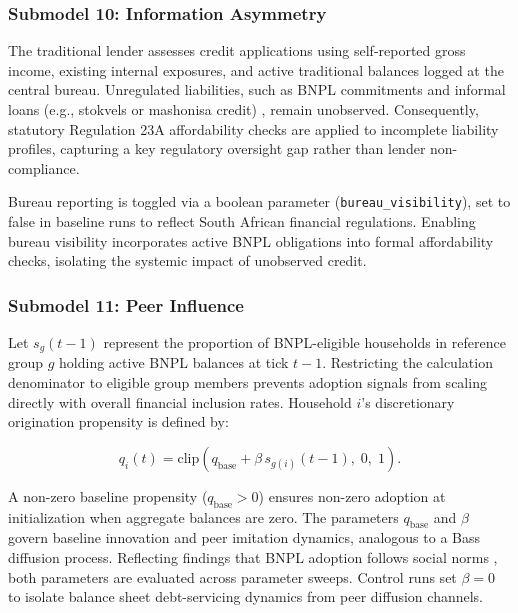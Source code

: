 \subsubsection*{Submodel 10: Information Asymmetry}
\label{sec:asymmetry}

The traditional lender assesses credit applications using self-reported gross income, existing internal exposures, and active traditional balances logged at the central bureau.
Unregulated liabilities, such as \ac{BNPL} commitments \cite{nortonrose_bnpl_sa, transunion_cps_sa_2025} and informal loans (e.g., stokvels or mashonisa credit) \cite{finscope2019}, remain unobserved. Consequently, statutory Regulation 23A affordability checks are applied to incomplete liability profiles, capturing a key regulatory oversight gap rather than lender non-compliance.

Bureau reporting is toggled via a boolean parameter (\texttt{bureau\_visibility}), set to false in baseline runs to reflect South African financial regulations.
Enabling bureau visibility incorporates active \ac{BNPL} obligations into formal affordability checks, isolating the systemic impact of unobserved credit.

\subsubsection*{Submodel 11: Peer Influence}
\label{sec:peer-influence}

Let $s_g(t-1)$ represent the proportion of \ac{BNPL}-eligible households in reference group $g$ holding active \ac{BNPL} balances at tick $t-1$. Restricting the calculation denominator to eligible group members prevents adoption signals from scaling directly with overall financial inclusion rates. Household $i$'s discretionary origination propensity is defined by:

\begin{equation}
    q_i(t) = \mathrm{clip}\!\left(q_{\text{base}} + \beta \, s_{g(i)}(t-1),\; 0,\; 1\right).
    \label{eq:peer}
\end{equation}

A non-zero baseline propensity ($q_{\text{base}} > 0$) ensures non-zero adoption at initialization when aggregate balances are zero.
The parameters $q_{\text{base}}$ and $\beta$ govern baseline innovation and peer imitation dynamics, analogous to a Bass diffusion process.
Reflecting findings that \ac{BNPL} adoption follows social norms \cite{ackert2025bnpl, cardaci2018inequality}, both parameters are evaluated across parameter sweeps.
Control runs set $\beta = 0$ to isolate balance sheet debt-servicing dynamics from peer diffusion channels.

